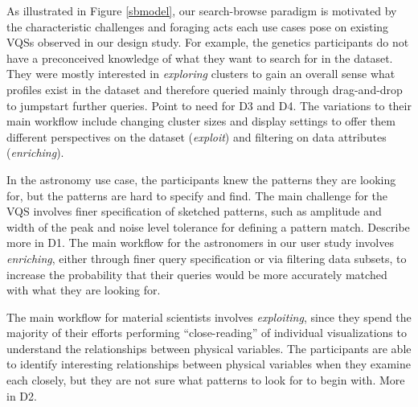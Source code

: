\par As illustrated in Figure \ref{sbmodel}, our search-browse paradigm is motivated by the characteristic challenges and foraging acts each use cases pose on existing VQSs observed in our design study. For example, the genetics participants do not have a preconceived knowledge of what they want to search for in the dataset. They were mostly interested in \textit{exploring} clusters to gain an overall sense what profiles exist in the dataset  and therefore queried mainly through drag-and-drop to jumpstart further queries. Point to need for D3 and D4. The variations to their main workflow include changing cluster sizes and display settings to offer them different perspectives on the dataset (\textit{exploit}) and filtering on data attributes (\textit{enriching}).
\par In the astronomy use case, the participants knew the patterns they are looking for, but the patterns are hard to specify and find. The main challenge for the VQS involves finer specification of sketched patterns, such as amplitude and width of the peak and noise level tolerance for defining a pattern match. Describe more in D1. The main workflow for the astronomers in our user study involves \textit{enriching}, either through finer query specification or via filtering data subsets, to increase the probability that their queries would be more accurately matched with what they are looking for.
\par The main workflow for material scientists involves \textit{exploiting}, since they spend the majority of their efforts performing ``close-reading'' of individual visualizations to understand the relationships between physical variables. The participants are able to identify interesting relationships between physical variables when they examine each closely, but they are not sure what patterns to look for to begin with. More in D2.

